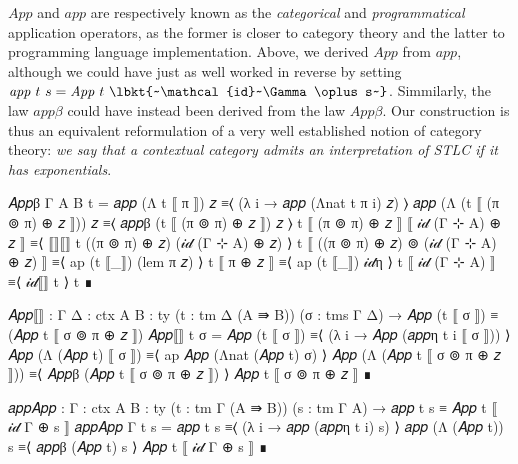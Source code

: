 $\mathit{App}$ and $\mathit{app}$ are respectively known as the
\emph{categorical} and \emph{programmatical} application operators, as the
former is closer to category theory and the latter to programming language
implementation. Above, we derived $\mathit{App}$ from $\mathit{app}$, although
we could have just as well worked in reverse by setting $\mathit{app}~t~s =
\mathit{App}~t~\lbkt{~\mathcal{id}~\Gamma \oplus s~}$. Simmilarly, the law
$\mathit{app}\beta$ could have instead been derived from the law
$\mathit{App}\beta$. Our construction is thus an equivalent reformulation of a
very well established notion of category theory: \emph{we say that a contextual
category admits an interpretation of STLC if it has exponentials}.

\begin{code}[hide]
  𝐴𝑝𝑝β {Γ} {A} {B} t =
    𝑎𝑝𝑝 (Λ t ⟦ π ⟧) 𝑧
      ≡⟨ (λ i → 𝑎𝑝𝑝 (Λnat t π i) 𝑧) ⟩
    𝑎𝑝𝑝 (Λ (t ⟦ (π ⊚ π) ⊕ 𝑧 ⟧)) 𝑧
      ≡⟨ 𝑎𝑝𝑝β (t ⟦ (π ⊚ π) ⊕ 𝑧 ⟧) 𝑧 ⟩
    t ⟦ (π ⊚ π) ⊕ 𝑧 ⟧ ⟦ 𝒾𝒹 (Γ ⊹ A) ⊕ 𝑧 ⟧
      ≡⟨ ⟦⟧⟦⟧ t ((π ⊚ π) ⊕ 𝑧) (𝒾𝒹 (Γ ⊹ A) ⊕ 𝑧) ⟩
    t ⟦ ((π ⊚ π) ⊕ 𝑧) ⊚ (𝒾𝒹 (Γ ⊹ A) ⊕ 𝑧) ⟧
      ≡⟨ ap (t ⟦_⟧) (lem π 𝑧) ⟩
    t ⟦ π ⊕ 𝑧 ⟧
      ≡⟨ ap (t ⟦_⟧) 𝒾𝒹η ⟩
    t ⟦ 𝒾𝒹 (Γ ⊹ A) ⟧
      ≡⟨ 𝒾𝒹⟦⟧ t ⟩
    t
      ∎

  𝐴𝑝𝑝⟦⟧ : {Γ Δ : ctx} {A B : ty} (t : tm Δ (A ⇛ B)) (σ : tms Γ Δ) →
    𝐴𝑝𝑝 (t ⟦ σ ⟧) ≡ (𝐴𝑝𝑝 t ⟦ σ ⊚ π ⊕ 𝑧 ⟧)
  𝐴𝑝𝑝⟦⟧ t σ =
    𝐴𝑝𝑝 (t ⟦ σ ⟧)
      ≡⟨ (λ i → 𝐴𝑝𝑝 (𝑎𝑝𝑝η t i ⟦ σ ⟧)) ⟩
    𝐴𝑝𝑝 (Λ (𝐴𝑝𝑝 t) ⟦ σ ⟧)
      ≡⟨ ap 𝐴𝑝𝑝 (Λnat (𝐴𝑝𝑝 t) σ) ⟩
    𝐴𝑝𝑝 (Λ (𝐴𝑝𝑝 t ⟦ σ ⊚ π ⊕ 𝑧 ⟧))
      ≡⟨ 𝐴𝑝𝑝β (𝐴𝑝𝑝 t ⟦ σ ⊚ π ⊕ 𝑧 ⟧) ⟩
    𝐴𝑝𝑝 t ⟦ σ ⊚ π ⊕ 𝑧 ⟧
      ∎

  𝑎𝑝𝑝𝐴𝑝𝑝 : {Γ : ctx} {A B : ty} (t : tm Γ (A ⇛ B)) (s : tm Γ A) →
    𝑎𝑝𝑝 t s ≡ 𝐴𝑝𝑝 t ⟦ 𝒾𝒹 Γ ⊕ s ⟧
  𝑎𝑝𝑝𝐴𝑝𝑝 {Γ} t s =
    𝑎𝑝𝑝 t s
      ≡⟨ (λ i → 𝑎𝑝𝑝 (𝑎𝑝𝑝η t i) s) ⟩
    𝑎𝑝𝑝 (Λ (𝐴𝑝𝑝 t)) s
      ≡⟨ 𝑎𝑝𝑝β (𝐴𝑝𝑝 t) s ⟩
    𝐴𝑝𝑝 t ⟦ 𝒾𝒹 Γ ⊕ s ⟧
      ∎
\end{code}

